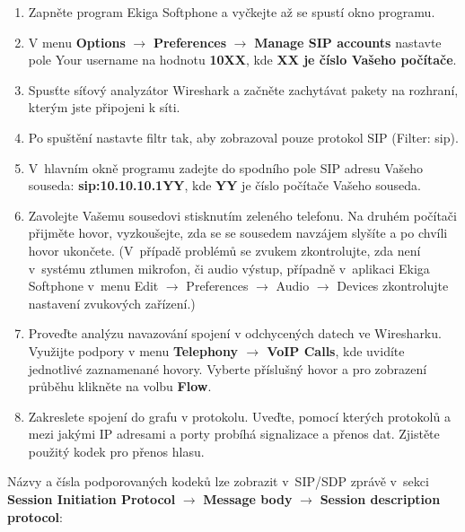 \begin{enumerate}
    \item Zapněte program Ekiga Softphone a vyčkejte až se spustí okno programu.
    \item V menu {\bf Options} $\rightarrow$ {\bf Preferences} $\rightarrow$ {\bf Manage SIP accounts} nastavte pole Your username na hodnotu {\bf 10XX}, kde {\bf XX je číslo Vašeho počítače}.
    \item Spusťte síťový analyzátor Wireshark a začněte zachytávat pakety na rozhraní, kterým jste připojeni k síti.
    \item Po spuštění nastavte filtr tak, aby zobrazoval pouze protokol SIP (Filter: sip).
    \item V hlavním okně programu zadejte do spodního pole SIP adresu Vašeho souseda: {\bf sip:10.10.10.1YY}, kde {\bf YY} je číslo počítače Vašeho souseda.
    \item Zavolejte Vašemu sousedovi stisknutím zeleného telefonu. Na druhém počítači přijměte hovor, vyzkoušejte, zda se se sousedem navzájem slyšíte a po chvíli hovor ukončete.
(V případě problémů se zvukem zkontrolujte, zda není v systému ztlumen mikrofon, či audio výstup, případně v aplikaci Ekiga Softphone v menu Edit $\rightarrow$ Preferences $\rightarrow$ Audio $\rightarrow$ Devices zkontrolujte nastavení zvukových zařízení.) 
    \item Proveďte analýzu navazování spojení v odchycených datech ve Wiresharku. Využijte podpory v menu {\bf Telephony $\rightarrow$ VoIP Calls}, kde uvidíte jednotlivé zaznamenané hovory. Vyberte příslušný hovor a pro zobrazení průběhu klikněte na volbu {\bf Flow}.
    \item Zakreslete spojení do grafu v protokolu. Uveďte, pomocí kterých protokolů a mezi jakými IP adresami a porty probíhá signalizace a přenos dat. Zjistěte použitý kodek pro přenos hlasu.
\end{enumerate}
Názvy a čísla podporovaných kodeků lze zobrazit v SIP/SDP zprávě v sekci {\bf Session Initiation Protocol} $\rightarrow$ {\bf Message body} $\rightarrow$ {\bf Session description protocol}:
\begin{figure}[h!]
  \centering
\end{figure}

